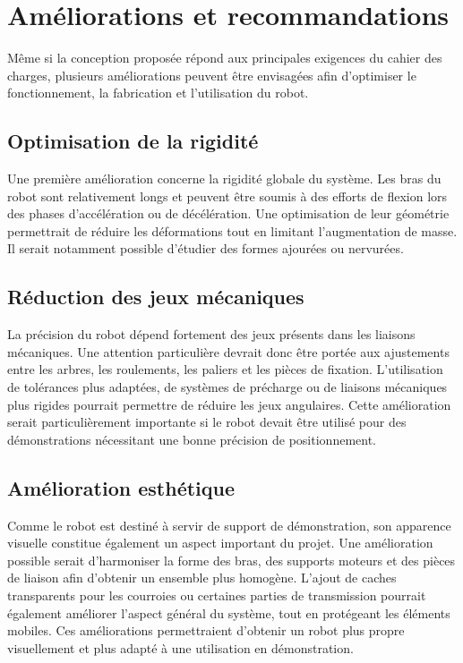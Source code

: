 \section{Améliorations et recommandations}
Même si la conception proposée répond aux principales exigences du cahier des charges,
plusieurs améliorations peuvent être envisagées afin d'optimiser le fonctionnement, la fabrication et l'utilisation du robot.
\subsection{Optimisation de la rigidité} Une première amélioration concerne la rigidité globale du système. Les bras du robot sont relativement longs et peuvent être soumis à des efforts de flexion lors des phases d'accélération ou de décélération. 
Une optimisation de leur géométrie permettrait de réduire les déformations tout en limitant l'augmentation de masse.
 Il serait notamment possible d'étudier des formes ajourées ou nervurées.
\subsection{Réduction des jeux mécaniques} 
La précision du robot dépend fortement des jeux présents dans les liaisons mécaniques.
 Une attention particulière devrait donc être portée aux ajustements entre les arbres, les roulements, les paliers et les pièces de fixation. 
 \newline
 L'utilisation de tolérances plus adaptées, de systèmes de précharge ou de liaisons mécaniques plus rigides pourrait permettre de réduire les jeux angulaires. 
Cette amélioration serait particulièrement importante si le robot devait être utilisé pour des démonstrations nécessitant une bonne précision de positionnement.
\subsection{Amélioration esthétique}
Comme le robot est destiné à servir de support de démonstration, son apparence visuelle constitue également un aspect important du projet.
Une amélioration possible serait d'harmoniser la forme des bras, des supports moteurs et des pièces de liaison afin d'obtenir un ensemble plus homogène. L'ajout de caches transparents pour les courroies ou certaines parties de transmission pourrait également améliorer l'aspect général du système, tout en protégeant les éléments mobiles.
\newline
Ces améliorations permettraient d'obtenir un robot plus propre visuellement et plus adapté à une utilisation en démonstration.